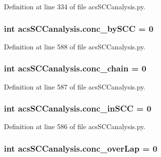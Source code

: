 Definition at line 334 of file acs\-S\-C\-Canalysis.\-py.

\hypertarget{a00097_aac2f508d526d62bd7f9d4f5a5f8b1821}{
\subsubsection[{conc\-\_\-by\-S\-C\-C}]{\setlength{\rightskip}{0pt plus 5cm}int acs\-S\-C\-Canalysis.\-conc\-\_\-by\-S\-C\-C = 0}}\label{a00097_aac2f508d526d62bd7f9d4f5a5f8b1821}


Definition at line 588 of file acs\-S\-C\-Canalysis.\-py.

\hypertarget{a00097_a3188cc39362e42ecb36d23a98f2b5a78}{
\subsubsection[{conc\-\_\-chain}]{\setlength{\rightskip}{0pt plus 5cm}int acs\-S\-C\-Canalysis.\-conc\-\_\-chain = 0}}\label{a00097_a3188cc39362e42ecb36d23a98f2b5a78}


Definition at line 587 of file acs\-S\-C\-Canalysis.\-py.

\hypertarget{a00097_a3fcb8f9c7e88b5c53f1201a383b38666}{
\subsubsection[{conc\-\_\-in\-S\-C\-C}]{\setlength{\rightskip}{0pt plus 5cm}int acs\-S\-C\-Canalysis.\-conc\-\_\-in\-S\-C\-C = 0}}\label{a00097_a3fcb8f9c7e88b5c53f1201a383b38666}


Definition at line 586 of file acs\-S\-C\-Canalysis.\-py.

\hypertarget{a00097_afd3169174539244248b78c8da2bba265}{
\subsubsection[{conc\-\_\-over\-Lap}]{\setlength{\rightskip}{0pt plus 5cm}int acs\-S\-C\-Canalysis.\-conc\-\_\-over\-Lap = 0}}\label{a00097_afd3169174539244248b78c8da2bba265}



